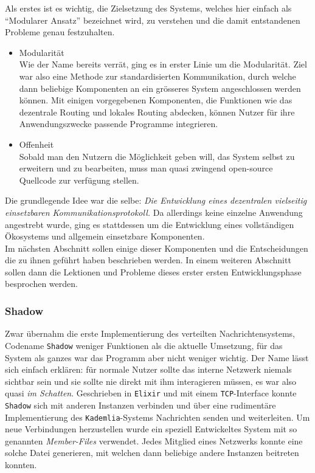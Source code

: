 \documentclass[11pt]{article}
\begin{document}
\noindent Als erstes ist es wichtig, die Zielsetzung des Systems,
welches hier einfach als “Modularer Ansatz” bezeichnet wird, zu
verstehen und die damit entstandenen Probleme genau festzuhalten.
\begin{itemize}
\item Modularität \\
Wie der Name bereits verrät, ging es in erster Linie um die
Modularität. Ziel war also eine Methode zur standardisierten
Kommunikation, durch welche dann beliebige Komponenten an ein
grösseres System angeschlossen werden können. Mit einigen
vorgegebenen Komponenten, die Funktionen wie das dezentrale Routing
und lokales Routing abdecken, können Nutzer für ihre
Anwendungszwecke passende Programme integrieren.
\item Offenheit \\
Sobald man den Nutzern die Möglichkeit geben will, das System selbst
zu erweitern und zu bearbeiten, muss man quasi zwingend open-source
Quellcode zur verfügung stellen.
\end{itemize}

\noindent Die grundlegende Idee war die selbe: \emph{Die Entwicklung eines
dezentralen vielseitig einsetzbaren Kommunikationsprotokoll.} Da
allerdings keine einzelne Anwendung angestrebt wurde, ging es
stattdessen um die Entwicklung eines vollständigen Ökosystems und
allgemein einsetzbare Komponenten.\\

\noindent Im nächsten Abschnitt sollen einige dieser Komponenten und
die Entscheidungen die zu ihnen geführt haben beschrieben werden. In
einem weiteren Abschnitt sollen dann die Lektionen und Probleme dieses
erster ersten Entwicklungsphase besprochen werden. 
\subsubsection{Shadow}
\label{sec:orge6ccf30}
Zwar übernahm die erste Implementierung des verteilten
Nachrichtensystems, Codename \texttt{Shadow} weniger Funktionen als die
aktuelle Umsetzung, für das System als ganzes war das Programm aber
nicht weniger wichtig. Der Name lässt sich einfach erklären: für
normale Nutzer sollte das interne Netzwerk niemals sichtbar sein und
sie sollte nie direkt mit ihm interagieren müssen, es war also quasi
\emph{im Schatten}. Geschrieben in \texttt{Elixir} und mit einem \texttt{TCP}-Interface konnte
\texttt{Shadow} sich mit anderen Instanzen verbinden und über eine rudimentäre
Implementierung des \texttt{Kademlia}-Systems Nachrichten senden und
weiterleiten. Um neue Verbindungen herzustellen wurde ein speziell
Entwickeltes System mit so genannten \emph{Member-Files} verwendet. Jedes
Mitglied eines Netzwerks konnte eine solche Datei generieren, mit
welchen dann beliebige andere Instanzen beitreten konnten.\\
\end{document}
